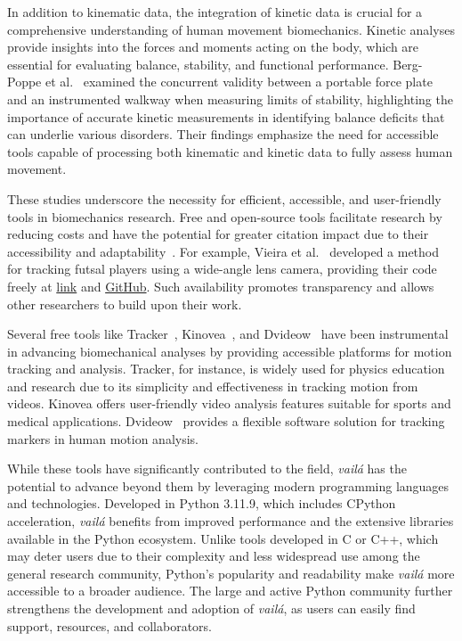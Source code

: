 \documentclass{article}
\begin{document}
In addition to kinematic data, the integration of kinetic data is crucial for a comprehensive understanding of human movement biomechanics. Kinetic analyses provide insights into the forces and moments acting on the body, which are essential for evaluating balance, stability, and functional performance. Berg-Poppe et al.~\citep{berg2018concurrent} examined the concurrent validity between a portable force plate and an instrumented walkway when measuring limits of stability, highlighting the importance of accurate kinetic measurements in identifying balance deficits that can underlie various disorders. Their findings emphasize the need for accessible tools capable of processing both kinematic and kinetic data to fully assess human movement.

These studies underscore the necessity for efficient, accessible, and user-friendly tools in biomechanics research. Free and open-source tools facilitate research by reducing costs and have the potential for greater citation impact due to their accessibility and adaptability~\citep{vieira2017tracking}. For example, Vieira et al.~\citep{vieira2017tracking} developed a method for tracking futsal players using a wide-angle lens camera, providing their code freely at \href{https://webctim.ulpgc.es/demo112/}{link} and \href{https://github.com/paulopreto/Radial-Distortion-Correction-Sports-Video-Sequences}{GitHub}. Such availability promotes transparency and allows other researchers to build upon their work.

Several free tools like Tracker~\citep{wee2013open}, Kinovea~\citep{abd2015reliability}, and Dvideow~\citep{figueroa2003flexible} have been instrumental in advancing biomechanical analyses by providing accessible platforms for motion tracking and analysis. Tracker, for instance, is widely used for physics education and research due to its simplicity and effectiveness in tracking motion from videos. Kinovea offers user-friendly video analysis features suitable for sports and medical applications. Dvideow~\citep{figueroa2003flexible} provides a flexible software solution for tracking markers in human motion analysis.

While these tools have significantly contributed to the field, \textit{vailá} has the potential to advance beyond them by leveraging modern programming languages and technologies. Developed in Python 3.11.9, which includes CPython acceleration, \textit{vailá} benefits from improved performance and the extensive libraries available in the Python ecosystem. Unlike tools developed in C or C++, which may deter users due to their complexity and less widespread use among the general research community, Python's popularity and readability make \textit{vailá} more accessible to a broader audience. The large and active Python community further strengthens the development and adoption of \textit{vailá}, as users can easily find support, resources, and collaborators.
\end{document}
